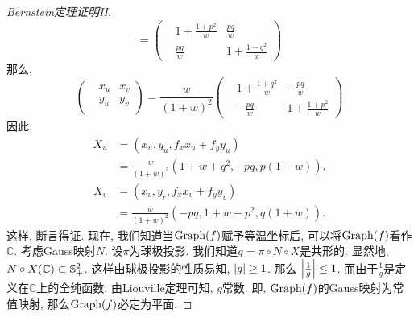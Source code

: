 \begin{proof}[Bernstein定理证明II]
\begin{equation}
        =
        \begin{pmatrix}
            &1+\frac{1+p^2}{w} & \frac{pq}{w} \\
            &\frac{pq}{w} & 1+\frac{1+q^2}{w}
        \end{pmatrix}
    \end{equation}
    那么, 
    \begin{equation}
        \begin{pmatrix}
            &x_u &x_v \\
            &y_u &y_v\\
        \end{pmatrix}
        =
        \frac{w}{(1+w)^2} 
        \begin{pmatrix}
            &1+\frac{1+q^2}{w} & -\frac{pq}{w} \\
            &-\frac{pq}{w} & 1+\frac{1+p^2}{w}
        \end{pmatrix}
    \end{equation}
    因此, 
    \begin{equation}
        \begin{split}
            X_u &=(x_u,y_u, f_xx_u+f_yy_u) \\
            &=\frac{w}{(1+w)^2}(1+w+q^2, -pq, p(1+w)).
        \end{split}
    \end{equation}
    \begin{equation}
        \begin{split}
            X_v &=(x_v,y_r, f_xx_v+f_yy_v) \\
            &=\frac{w}{(1+w)^2}(-pq, 1+w+p^2, q(1+w)).
        \end{split}
    \end{equation}
    这样, 断言得证. 现在, 我们知道当$\G(f)$赋予等温坐标后, 可以将$\G(f)$看作$\mathbb{C}$. 考虑Gauss映射$N$.  设$\pi$为球极投影. 我们知道$g=\pi\circ N \circ X$是共形的. 显然地, $N\circ X(\mathbb{C}) \subset \S^2_+$. 这样由球极投影的性质易知, $\abs{g} \ge 1$. 那么 $\abs{\frac{1}{g}} \le 1$. 而由于$\frac{1}{g}$是定义在$\mathbb{C}$上的全纯函数, 由Liouville定理可知, $g$常数. 即, $\G(f)$的Gauss映射为常值映射, 那么$\G(f)$必定为平面.
\end{proof}
